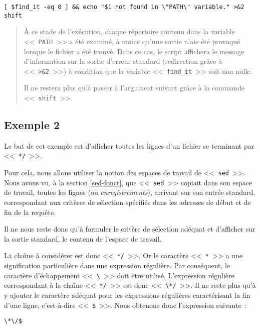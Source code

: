 \begin{verbatim}
[ $find_it -eq 0 ] && echo "$1 not found in \"PATH\" variable." >&2
shift
\end{verbatim}
\begin{quote}
{\`A} ce stade de l'ex{\'e}cution, chaque r{\'e}pertoire contenu dans la variable <<~{\tt PATH}~>>
a {\'e}t{\'e} examin{\'e}, {\`a} moins qu'une sortie n'aie {\'e}t{\'e} provoqu{\'e} lorsque le fichier a {\'e}t{\'e} trouv{\'e}.
Dans ce cas, le script affichera le message d'information sur la sortie d'erreur
standard (redirection gr{\^a}ce {\`a} <<~\verb=>&2=~>>) {\`a} condition que la variable
<<~\verb=find_it=~>> soit non nulle.

Il ne restera plus qu'{\`a} passer {\`a} l'argument suivant gr{\^a}ce {\`a} la commande <<~\verb=shift=~>>.
\end{quote}


\subsection{\label{adv-fltrs-sed-ex2}Exemple 2}

Le but de cet exemple est d'afficher toutes les lignes d'un fichier se terminant par
<<~\verb=*/=~>>.

Pour cela, nous allons utiliser la notion des espaces de travail de <<~{\tt sed}~>>.
Nous avons vu, {\`a} la section \ref{sed-fonct}, que <<~{\tt sed}~>> copiait dans son
espace de travail, toutes les lignes (ou {\sl enregistrements}), arrivant sur son
entr{\'e}e standard, correspondant aux crit{\`e}res de s{\'e}lection sp{\'e}cifi{\'e}s dans les adresses
de d{\'e}but et de fin de la requ{\^e}te.

Il ne nous reste donc qu'{\`a} formuler le crit{\`e}re de s{\'e}lection ad{\'e}quat et d'afficher sur
la sortie standard, le contenu de l'espace de travail.

La cha{\^\i}ne {\`a} consid{\'e}rer est donc <<~\verb=*/=~>>. Or le caract{\`e}re <<~\verb=*=~>> a une
signification particuli{\`e}re dans une expression r{\'e}guli{\`e}re. Par cons{\'e}quent, le caract{\`e}re
d'{\'e}chappement <<~\verb=\=~>> doit {\^e}tre utilis{\'e}. L'expression r{\'e}guli{\`e}re
correspondant {\`a} la cha{\^\i}ne <<~\verb=*/=~>> est donc <<~\verb=\*/=~>>. Il ne reste
plus qu'{\`a} y ajouter le caract{\`e}re ad{\'e}quat pour les expressions r{\'e}guli{\`e}res caract{\'e}risant
la fin d'une ligne, c'est-{\`a}-dire <<~\verb=$=~>>. Nous obtenons donc l'expression
suivante~:
\begin{center}
\verb=\*\/$=
\end{center}


